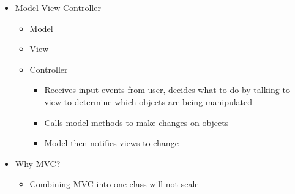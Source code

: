 \begin{itemize}
\begin{itemize}
        \item Model-View-Controller
        \begin{itemize}
            \item Model
            \item View
            \item Controller
            \begin{itemize}
                \item Receives input events from user, decides what to do by talking to view to determine which objects are being manipulated
                \item Calls model methods to make changes on objects
                \item Model then notifies views to change
            \end{itemize}
        \end{itemize}
    
        \item Why MVC?
        \begin{itemize}
            \item Combining MVC into one class will not scale
        \end{itemize}
    \end{itemize}
\end{itemize}
